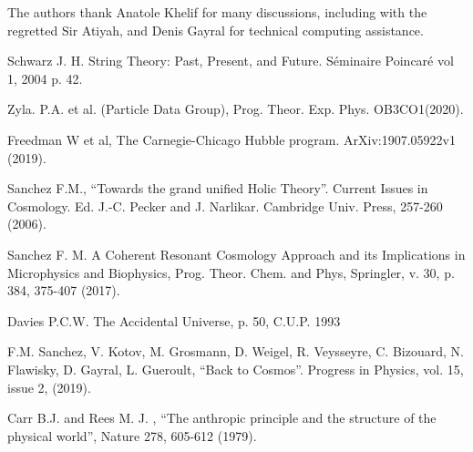 \documentclass[a4paper,9pt]{article}
\begin{document}
The authors thank Anatole Khelif for many discussions, including with the regretted Sir Atiyah, and Denis Gayral for technical computing assistance.

\pagebreak

  
\begin{thebibliography}{99}



 Schwarz J. H. String Theory: Past, Present, and Future. Séminaire Poincaré vol 1, 2004 p. 42.

 Zyla. P.A. et al. (Particle Data Group), Prog. Theor. Exp. Phys. OB3CO1(2020).


 Freedman W et al, The Carnegie-Chicago Hubble program. ArXiv:1907.05922v1 (2019).


 Sanchez F.M., “Towards the grand unified Holic Theory”. Current Issues in Cosmology. Ed. J.-C. Pecker and J. Narlikar. Cambridge Univ. Press, 257-260 (2006).



 Sanchez F. M. A Coherent Resonant Cosmology Approach and its Implications in Microphysics and Biophysics, Prog. Theor. Chem. and Phys, Springler, v. 30, p. 384, 375-407 (2017).

 Davies P.C.W. The Accidental Universe, p. 50, C.U.P. 1993


 F.M. Sanchez, V. Kotov, M. Grosmann, D. Weigel, R. Veysseyre, C. Bizouard, N. Flawisky, D. Gayral, L. Gueroult, ``Back to Cosmos''. Progress in Physics, vol. 15, issue 2, (2019).


 Carr B.J. and Rees M. J. , “The anthropic principle and the structure of the physical world”, Nature 278, 605-612 (1979).




\end{thebibliography}
\end{document}

